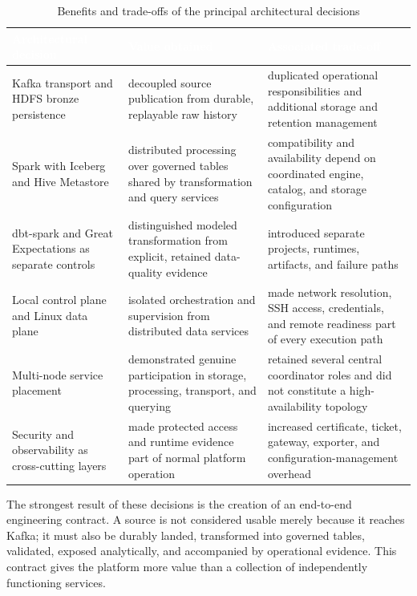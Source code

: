 \begin{table}[!htbp]
    \centering
    \footnotesize
    \renewcommand{\arraystretch}{1.14}
    \begin{tabularx}{\textwidth}{|L{0.25\textwidth}|Y|Y|}
        \hline
        \textcolor{white}{\textbf{Architectural decision}} & \textcolor{white}{\textbf{Value obtained}} & \textcolor{white}{\textbf{Associated trade-off}} \\
        \hline
        Kafka transport and HDFS bronze persistence & decoupled source publication from durable, replayable raw history & duplicated operational responsibilities and additional storage and retention management \\
        \hline
        Spark with Iceberg and Hive Metastore & distributed processing over governed tables shared by transformation and query services & compatibility and availability depend on coordinated engine, catalog, and storage configuration \\
        \hline
        dbt-spark and Great Expectations as separate controls & distinguished modeled transformation from explicit, retained data-quality evidence & introduced separate projects, runtimes, artifacts, and failure paths \\
        \hline
        Local control plane and Linux data plane & isolated orchestration and supervision from distributed data services & made network resolution, SSH access, credentials, and remote readiness part of every execution path \\
        \hline
        Multi-node service placement & demonstrated genuine participation in storage, processing, transport, and querying & retained several central coordinator roles and did not constitute a high-availability topology \\
        \hline
        Security and observability as cross-cutting layers & made protected access and runtime evidence part of normal platform operation & increased certificate, ticket, gateway, exporter, and configuration-management overhead \\
        \hline
    \end{tabularx}
    \caption{Benefits and trade-offs of the principal architectural decisions}
    \label{tab:chapter9-architectural-decisions}
\end{table}
\FloatBarrier

The strongest result of these decisions is the creation of an end-to-end engineering contract. A source is not considered usable merely because it reaches Kafka; it must also be durably landed, transformed into governed tables, validated, exposed analytically, and accompanied by operational evidence. This contract gives the platform more value than a collection of independently functioning services.

